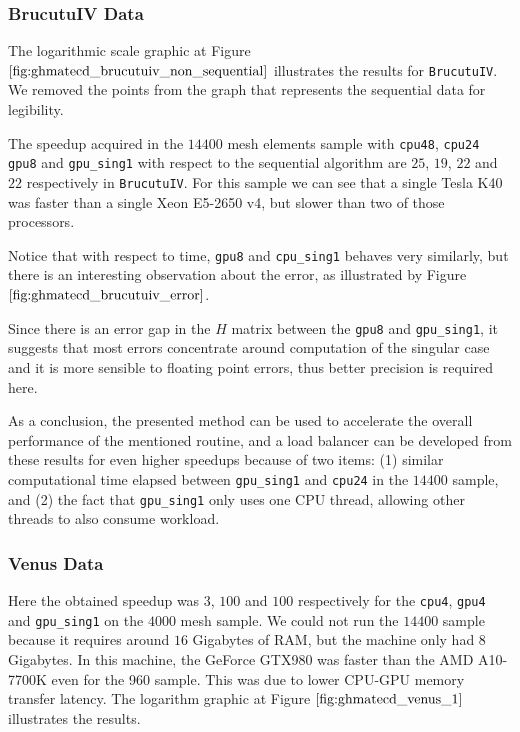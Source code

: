 \subsubsection{BrucutuIV Data}

The logarithmic scale graphic at Figure $\ref{fig:ghmatecd_brucutuiv_non_sequential}$ illustrates the
results for \texttt{BrucutuIV}. We removed the points from the graph that represents the sequential data for legibility.

The speedup acquired in the $14400$ mesh elements sample with \texttt{cpu48}, \texttt{cpu24} 
\texttt{gpu8} and \texttt{gpu\_sing1} with respect to the sequential algorithm are 
$25$, $19$, $22$ and $22$ respectively in \texttt{BrucutuIV}. For this sample we can see that a single Tesla K40
was faster than a single Xeon E5-2650 v4, but slower than two of those processors.

Notice that with respect to time, \texttt{gpu8} and \texttt{cpu\_sing1} behaves very similarly, 
but there is an interesting observation about the error, as illustrated by 
Figure $\ref{fig:ghmatecd_brucutuiv_error}$. 

Since there is an error gap in the $H$ matrix between the \texttt{gpu8} and \texttt{gpu\_sing1}, it suggests that most 
errors concentrate around computation of the singular case and it is more sensible to floating point errors, thus better 
precision is required here.

As a conclusion, the presented method can be used to accelerate the overall performance of the mentioned routine, 
and a load balancer can be developed from these results for even higher speedups because of two items: (1) similar 
computational time elapsed between \texttt{gpu\_sing1} and \texttt{cpu24} in the $14400$ sample, and (2) 
the fact that \texttt{gpu\_sing1} only uses one CPU thread, allowing other threads to also consume workload.

\subsubsection{Venus Data}

Here the obtained speedup was $3$, $100$ and $100$ respectively for the \texttt{cpu4}, 
\texttt{gpu4} and \texttt{gpu\_sing1} on the $4000$ mesh sample. We could not run the $14400$ 
sample because it requires around $16$ Gigabytes of RAM, but the machine only had $8$ Gigabytes.
In this machine, the GeForce GTX980 was faster than the AMD A10-7700K even for the 960 sample. This was due to 
lower CPU-GPU memory transfer latency. The logarithm graphic at 
Figure $\ref{fig:ghmatecd_venus_1}$ illustrates the results.

